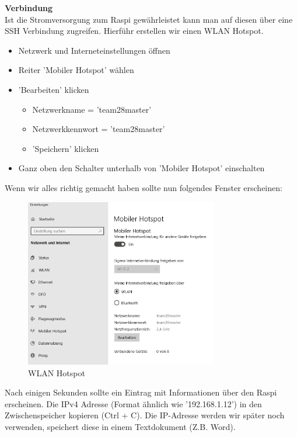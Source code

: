 \documentclass[../../main.tex]{subfiles}
\begin{document}
\textbf{Verbindung}\\
Ist die Stromversorgung zum Raspi gewährleistet kann man auf diesen über eine SSH Verbindung zugreifen. Hierführ erstellen wir einen WLAN Hotspot.
\begin{itemize}
    \item Netzwerk und Interneteinstellungen öffnen
    \item Reiter 'Mobiler Hotspot' wählen
    \item 'Bearbeiten' klicken
    \begin{itemize}
        \item Netzwerkname = 'team28master'
        \item Netzwerkkennwort = 'team28master'
        \item 'Speichern' klicken
    \end{itemize}
    \item Ganz oben den Schalter unterhalb von 'Mobiler Hotspot' einschalten
\end{itemize}

Wenn wir alles richtig gemacht haben sollte nun folgendes Fenster erscheinen:
\begin{figure}[H] \centering
    \includegraphics[width=0.75\textwidth]{HotSpot}
    \caption{WLAN Hotspot}
    \label{fig:HotSpot}
\end{figure}

Nach einigen Sekunden sollte ein Eintrag mit Informationen über den Raspi erscheinen.
Die IPv4 Adresse (Format ähnlich wie '192.168.1.12') in den Zwischenspeicher kopieren (Ctrl + C). Die IP-Adresse werden wir später noch verwenden, speichert diese in einem Textdokument (Z.B. Word). \\
\end{document}

